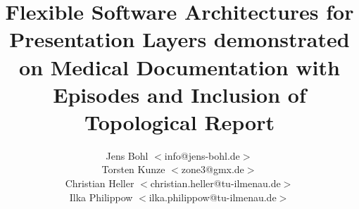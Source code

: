 \title{Flexible Software Architectures for Presentation Layers demonstrated on Medical Documentation with Episodes and Inclusion of Topological Report}
\author{Jens Bohl \(<\)info@jens-bohl.de\(>\)\\
Torsten Kunze \(<\)zone3@gmx.de\(>\)\\
Christian Heller \(<\)christian.heller@tu-ilmenau.de\(>\)\\
Ilka Philippow \(<\)ilka.philippow@tu-ilmenau.de\(>\)}
\maketitle
